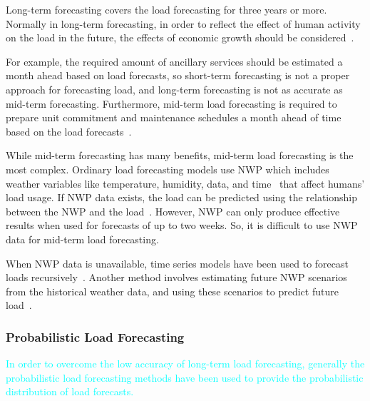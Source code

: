 \documentclass[journal]{IEEEtran} %
\begin{document}
Long-term forecasting covers the load forecasting for three years or more. Normally in long-term forecasting, in order to reflect the effect of human activity on the load in the future, the effects of economic growth should be considered~\cite{Hong2014}. 






For example, the required amount of ancillary services should be estimated a month ahead based on load forecasts, so short-term forecasting is not a proper approach for forecasting load, and long-term forecasting is not as accurate as mid-term forecasting. Furthermore, mid-term load forecasting is required to prepare unit commitment and maintenance schedules a month ahead of time based on the load forecasts~\cite{Burger2014}.





While mid-term forecasting has many benefits, mid-term load forecasting is the most complex. Ordinary load forecasting models use NWP which includes weather variables like temperature, humidity, data, and time~\cite{Xie2016a} that affect humans' load usage. If NWP data exists, the load can be predicted using the relationship between the NWP and the load~\cite{Bacher2013}. However, NWP can only produce effective results when used for forecasts of up to two weeks. So, it is difficult to use NWP data for mid-term load forecasting. 




When NWP data is unavailable, time series models have been used to forecast loads recursively~\cite{Lee2018}. Another method involves estimating future NWP scenarios from the historical weather data, and using these scenarios to predict future load~\cite{Xie2016a}. 







\subsubsection{Probabilistic Load Forecasting}
\textcolor{cyan}{In order to overcome the low accuracy of long-term load forecasting, generally the probabilistic load forecasting methods have been used to provide the probabilistic distribution of load forecasts.}
\end{document}
